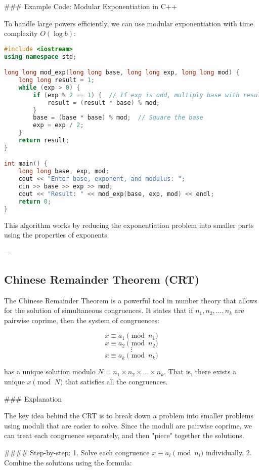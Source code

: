 \documentclass[10pt,a4paper]{article}
\begin{document}
### Example Code: Modular Exponentiation in C++

To handle large powers efficiently, we can use modular exponentiation with time complexity \(O(\log b)\):

\begin{lstlisting}[language=C++]
#include <iostream>
using namespace std;

long long mod_exp(long long base, long long exp, long long mod) {
    long long result = 1;
    while (exp > 0) {
        if (exp % 2 == 1) {  // If exp is odd, multiply base with result
            result = (result * base) % mod;
        }
        base = (base * base) % mod;  // Square the base
        exp = exp / 2;
    }
    return result;
}

int main() {
    long long base, exp, mod;
    cout << "Enter base, exponent, and modulus: ";
    cin >> base >> exp >> mod;
    cout << "Result: " << mod_exp(base, exp, mod) << endl;
    return 0;
}
\end{lstlisting}

This algorithm works by reducing the exponentiation problem into smaller parts using the properties of exponents.

---

\subsection*{Chinese Remainder Theorem (CRT)}

The Chinese Remainder Theorem is a powerful tool in number theory that allows for the solution of simultaneous congruences. It states that if \(n_1, n_2, \dots, n_k\) are pairwise coprime, then the system of congruences:

\[
x \equiv a_1 \pmod{n_1}
\]
\[
x \equiv a_2 \pmod{n_2}
\]
\[
\vdots
\]
\[
x \equiv a_k \pmod{n_k}
\]

has a unique solution modulo \(N = n_1 \times n_2 \times \dots \times n_k\). That is, there exists a unique \(x \pmod{N}\) that satisfies all the congruences.

### Explanation

The key idea behind the CRT is to break down a problem into smaller problems using moduli that are easier to solve. Since the moduli are pairwise coprime, we can treat each congruence separately, and then "piece" together the solutions.

#### Step-by-step:
1. Solve each congruence \(x \equiv a_i \pmod{n_i}\) individually.
2. Combine the solutions using the formula:
\end{document}
